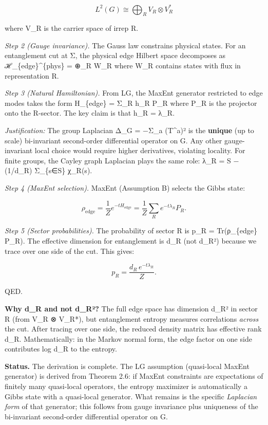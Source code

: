 \[
L^2(G) \cong \bigoplus_R V_R \otimes V_R^*
\]

where V\_R is the carrier space of irrep R.

\emph{Step 2 (Gauge invariance).} The Gauss law constrains physical states. For an entanglement cut at Σ, the physical edge Hilbert space decomposes as ℋ\_\{edge\}\^{}\{phys\} = ⊕\_R W\_R where W\_R contains states with flux in representation R.

\emph{Step 3 (Natural Hamiltonian).} From LG, the MaxEnt generator restricted to edge modes takes the form H\_\{edge\} = Σ\_R h\_R P\_R where P\_R is the projector onto the R-sector. The key claim is that h\_R = λ\_R.

\emph{Justification:} The group Laplacian Δ\_G = −Σ\_a (T\^{}a)² is the \textbf{unique} (up to scale) bi-invariant second-order differential operator on G. Any other gauge-invariant local choice would require higher derivatives, violating locality. For finite groups, the Cayley graph Laplacian plays the same role: λ\_R = \textbar S\textbar{} − (1/d\_R) Σ\_\{s∈S\} χ\_R(s).

\emph{Step 4 (MaxEnt selection).} MaxEnt (Assumption B) selects the Gibbs state:

\[
\rho_{\mathrm{edge}} = \frac{1}{Z} e^{-t H_{\mathrm{edge}}} = \frac{1}{Z}
\sum_R e^{-t \lambda_R} P_R.
\]

\emph{Step 5 (Sector probabilities).} The probability of sector R is p\_R = Tr(ρ\_\{edge\} P\_R). The effective dimension for entanglement is d\_R (not d\_R²) because we trace over one side of the cut. This gives:

\[
p_R = \frac{d_R \, e^{-t \lambda_R}}{Z}.
\]

QED.

\textbf{Why d\_R and not d\_R²?} The full edge space has dimension d\_R² in sector R (from V\_R ⊗ V\_R*), but entanglement entropy measures correlations \emph{across} the cut. After tracing over one side, the reduced density matrix has effective rank d\_R. Mathematically: in the Markov normal form, the edge factor on one side contributes log d\_R to the entropy.

\textbf{Status.} The derivation is complete. The LG assumption (quasi-local MaxEnt generator) is derived from Theorem 2.6: if MaxEnt constraints are expectations of finitely many quasi-local operators, the entropy maximizer is automatically a Gibbs state with a quasi-local generator. What remains is the specific \emph{Laplacian form} of that generator; this follows from gauge invariance plus uniqueness of the bi-invariant second-order differential operator on G.

